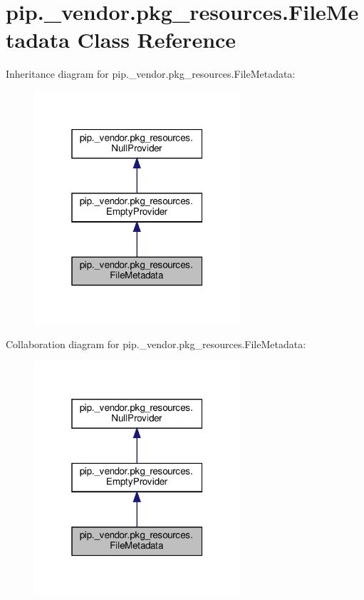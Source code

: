 \hypertarget{classpip_1_1__vendor_1_1pkg__resources_1_1FileMetadata}{}\section{pip.\+\_\+vendor.\+pkg\+\_\+resources.\+File\+Metadata Class Reference}
\label{classpip_1_1__vendor_1_1pkg__resources_1_1FileMetadata}


Inheritance diagram for pip.\+\_\+vendor.\+pkg\+\_\+resources.\+File\+Metadata\+:
\nopagebreak
\begin{figure}[H]
\begin{center}
\leavevmode
\includegraphics[width=217pt]{classpip_1_1__vendor_1_1pkg__resources_1_1FileMetadata__inherit__graph}
\end{center}
\end{figure}


Collaboration diagram for pip.\+\_\+vendor.\+pkg\+\_\+resources.\+File\+Metadata\+:
\nopagebreak
\begin{figure}[H]
\begin{center}
\leavevmode
\includegraphics[width=217pt]{classpip_1_1__vendor_1_1pkg__resources_1_1FileMetadata__coll__graph}
\end{center}
\end{figure}
